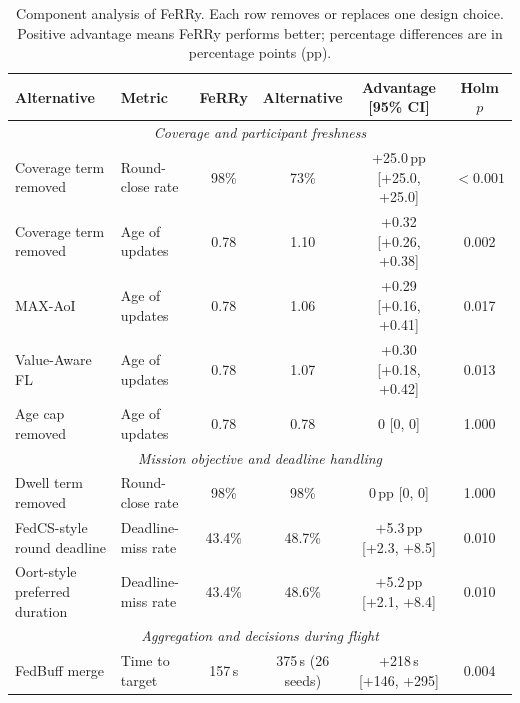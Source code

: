 \documentclass[conference]{IEEEtran}
\newcommand{\sysname}{FeRRy}
\begin{document}
\begin{table}[h]
\centering
\caption{Component analysis of \sysname{}. Each row removes or replaces one
design choice. Positive advantage means
\sysname{} performs better; percentage differences are in percentage points
(pp).}
\label{tab:component-analysis}
\small
\begin{tabular}{
p{}
p{}
c
c
c
c
}
\hline
\textbf{Alternative} &
\textbf{Metric} &
\textbf{\sysname{}} &
\textbf{Alternative} &
\textbf{Advantage [95\% CI]} &
\textbf{Holm $p$} \\
\hline

\multicolumn{6}{c}{\textit{Coverage and participant freshness}} \\
\hline

Coverage term removed &
Round-close rate &
98\% & 73\% &
+25.0\,pp [+25.0, +25.0] &
$<0.001$ \\

Coverage term removed &
Age of updates &
0.78 & 1.10 &
+0.32 [+0.26, +0.38] &
0.002 \\

MAX-AoI &
Age of updates &
0.78 & 1.06 &
+0.29 [+0.16, +0.41] &
0.017 \\

Value-Aware FL &
Age of updates &
0.78 & 1.07 &
+0.30 [+0.18, +0.42] &
0.013 \\

Age cap removed &
Age of updates &
0.78 & 0.78 &
0 [0, 0] &
1.000 \\

\hline
\multicolumn{6}{c}{\textit{Mission objective and deadline handling}} \\
\hline

Dwell term removed &
Round-close rate &
98\% & 98\% &
0\,pp [0, 0] &
1.000 \\

FedCS-style round deadline &
Deadline-miss rate &
43.4\% & 48.7\% &
+5.3\,pp [+2.3, +8.5] &
0.010 \\

Oort-style preferred duration &
Deadline-miss rate &
43.4\% & 48.6\% &
+5.2\,pp [+2.1, +8.4] &
0.010 \\

\hline
\multicolumn{6}{c}{\textit{Aggregation and decisions during flight}} \\
\hline

FedBuff merge &
Time to target &
157\,s & 375\,s (26 seeds) &
+218\,s [+146, +295] &
0.004 \\


\end{tabular}
\end{table}
\end{document}

